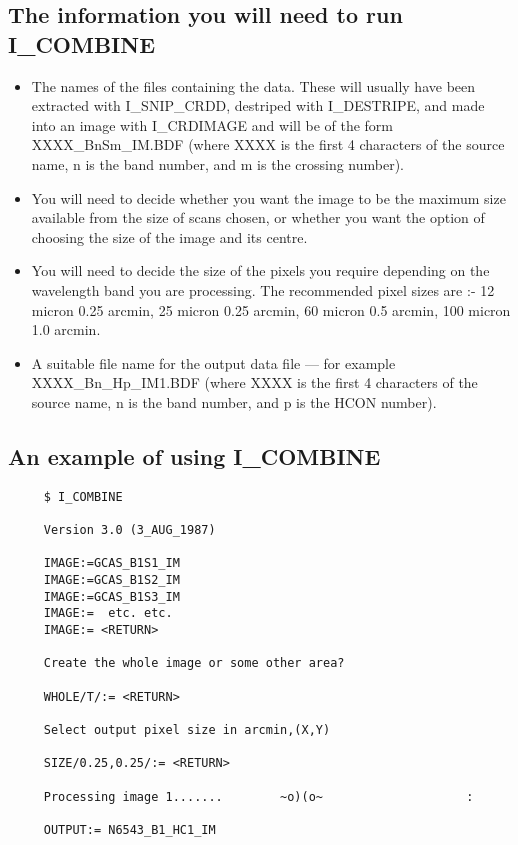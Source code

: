 \subsection {The information you will need to run I\_COMBINE}

\begin{itemize}
\item The names of the files containing the data. These will usually have been
extracted with I\_SNIP\_CRDD, destriped with I\_DESTRIPE, and made into an
image with I\_CRDIMAGE and will be of the form XXXX\_BnSm\_IM.BDF (where XXXX 
is the first 4 characters of the source name, n is the band number, and m is 
the crossing number).

\item You will need to decide whether you want the image to be the maximum size
available from the size of scans chosen, or whether you want the option of
choosing the size of the image and its centre.
     
\item You will need to decide the size of the pixels you require depending
on the wavelength band you are processing. The recommended pixel sizes are :-
12 micron  0.25 arcmin, 25 micron  0.25 arcmin, 60 micron   0.5 arcmin,
100 micron  1.0 arcmin.                                  

\item A suitable file name for the output data file --- for example 
XXXX\_Bn\_Hp\_IM1.BDF (where XXXX is the first 4 characters of the source 
name, n is the band number, and p is the HCON number).
     
\end {itemize}

\subsection {An example of using I\_COMBINE}

\begin {verbatim}
     $ I_COMBINE 

     Version 3.0 (3_AUG_1987)

     IMAGE:=GCAS_B1S1_IM
     IMAGE:=GCAS_B1S2_IM 
     IMAGE:=GCAS_B1S3_IM
     IMAGE:=  etc. etc. 
     IMAGE:= <RETURN>

     Create the whole image or some other area?

     WHOLE/T/:= <RETURN>

     Select output pixel size in arcmin,(X,Y)

     SIZE/0.25,0.25/:= <RETURN>

     Processing image 1.......        ~o)(o~                    :

     OUTPUT:= N6543_B1_HC1_IM
\end{verbatim}

